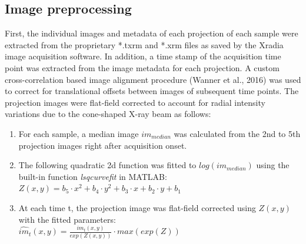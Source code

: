 \documentclass{article}
\begin{document}
\subsection*{Image preprocessing}
First, the individual images and metadata of each projection of each sample were extracted from the proprietary *.txrm and *.xrm files as saved by the Xradia image acquisition software. In addition, a time stamp of the acquisition time point was extracted from the image metadata for each projection. A custom cross-correlation based image alignment procedure (Wanner et al., 2016) was used to correct for translational offsets between images of subsequent time points. The projection images were flat-field corrected to account for radial intensity variations due to the cone-shaped X-ray beam as follows:
\begin{enumerate}
\item For each sample, a median image $im_{median}$ was calculated from the 2nd to 5th projection images right after acquisition onset.
\item The following quadratic 2d function was fitted to $log\left(im_{median}\right)$ using the built-in function \emph{lsqcurvefit} in MATLAB:\\
$Z\left(x,y\right) = b_{5}\cdot x^{2} + b_{4}\cdot y^{2} + b_{3}\cdot x + b_{2}\cdot y + b_{1}$
\item At each time t, the projection image was flat-field corrected using $Z\left(x,y\right)$ with the fitted parameters:\\
$\hat{im}_{t}\left(x,y\right) = \frac{im_{t}(x,y)}{exp(Z(x,y))}\cdot max\left(exp\left(Z\right)\right)$
\end{enumerate}
\end{document}
